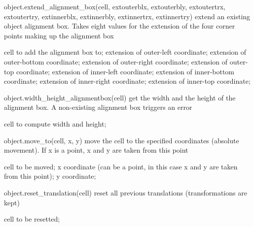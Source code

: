 \begin{APIfunc}{object.extend\_alignment\_box(cell, extouterblx, extouterbly, extoutertrx, extoutertry, extinnerblx, extinnerbly, extinnertrx, extinnertry)}
    extend an existing object alignment box. Takes eight values for the extension of the four corner points making up the alignment box
    \begin{APIparameters}
            cell to add the alignment box to;
            extension of outer-left coordinate;
            extension of outer-bottom coordinate;
            extension of outer-right coordinate;
            extension of outer-top coordinate;
            extension of inner-left coordinate;
            extension of inner-bottom coordinate;
            extension of inner-right coordinate;
            extension of inner-top coordinate;
    \end{APIparameters}
\end{APIfunc}
\begin{APIfunc}{object.width\_height\_alignmentbox(cell)}
    get the width and the height of the alignment box. A non-existing alignment box triggers an error
    \begin{APIparameters}
            cell to compute width and height;
    \end{APIparameters}
\end{APIfunc}
\begin{APIfunc}{object.move\_to(cell, x, y)}
    move the cell to the specified coordinates (absolute movement). If x is a point, x and y are taken from this point
    \begin{APIparameters}
            cell to be moved;
            x coordinate (can be a point, in this case x and y are taken from this point);
            y coordinate;
    \end{APIparameters}
\end{APIfunc}
\begin{APIfunc}{object.reset\_translation(cell)}
    reset all previous translations (transformations are kept)
    \begin{APIparameters}
            cell to be resetted;
    \end{APIparameters}
\end{APIfunc}
